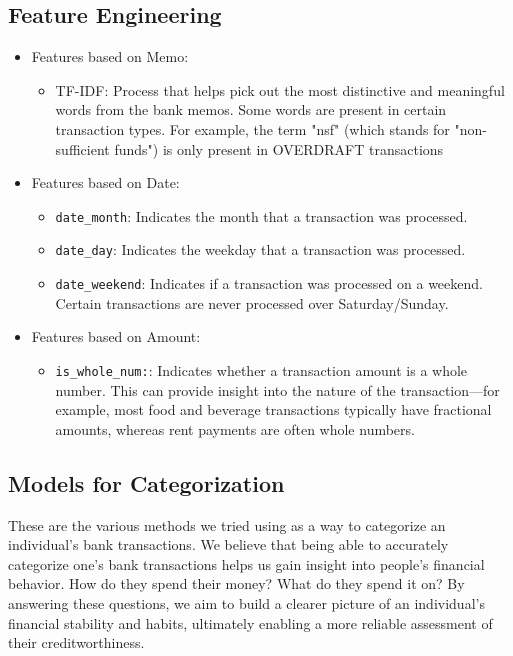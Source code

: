 \documentclass[12pt,letterpaper]{article}
\begin{document}
\subsection{Feature Engineering}
\begin{itemize}
    \item {Features based on Memo:}
        \begin{itemize}
            \item {TF-IDF}: Process that helps pick out the most distinctive and meaningful words from the bank memos. Some words are present in certain transaction types. For example, the term "nsf" (which stands for "non-sufficient funds") is only present in OVERDRAFT transactions
        \end{itemize}
    \item {Features based on Date:}
        \begin{itemize}
            \item 
                \texttt{date\_month}: Indicates the month that a transaction was processed.            
            \item 
                \texttt{date\_day}: Indicates the weekday that a transaction was processed. 
                
            \item 
                \texttt{date\_weekend}: Indicates if a transaction was processed on a weekend. Certain transactions are never processed over Saturday/Sunday.
        \end{itemize}
    \item {Features based on Amount:}
        \begin{itemize}
            \item 
                \texttt{is\_whole\_num:}: Indicates whether a transaction amount is a whole number. This can provide insight into the nature of the transaction—for example, most food and beverage transactions typically have fractional amounts, whereas rent payments are often whole numbers. 
        \end{itemize}
\end{itemize}

\subsection{Models for Categorization}
These are the various methods we tried using as a way to categorize an individual's bank transactions. We believe that being able to accurately categorize one’s bank transactions helps us gain insight into people’s financial behavior. How do they spend their money? What do they spend it on? By answering these questions, we aim to build a clearer picture of an individual’s financial stability and habits, ultimately enabling a more reliable assessment of their creditworthiness.
\end{document}
